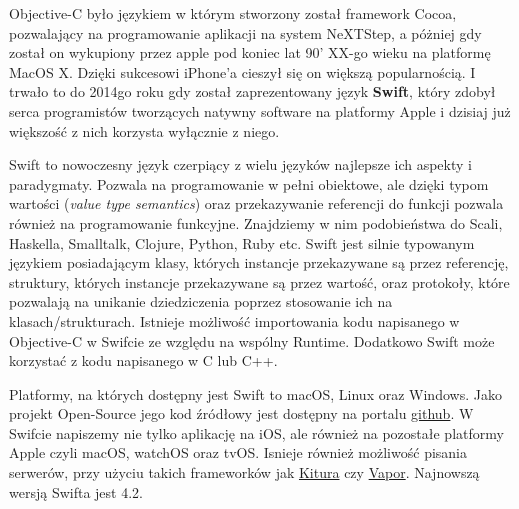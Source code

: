 \documentclass{article}
\begin{document}
Objective-C było językiem w którym stworzony został framework Cocoa, pozwalający
na programowanie aplikacji na system NeXTStep, a póżniej gdy został on wykupiony 
przez apple pod koniec lat 90' XX-go wieku na platformę MacOS X. Dzięki sukcesowi
iPhone'a cieszył się on większą popularnością. I trwało to do 2014go roku gdy
został zaprezentowany język \textbf{Swift}, który zdobył serca programistów tworzących
natywny software na platformy Apple i dzisiaj już większość z nich korzysta wyłącznie
z niego.

Swift to nowoczesny język czerpiący z wielu języków najlepsze ich aspekty i 
paradygmaty. Pozwala na programowanie w pełni obiektowe, ale dzięki typom wartości
(\textit{value type semantics}) oraz przekazywanie referencji do funkcji pozwala 
również na programowanie funkcyjne. Znajdziemy w nim podobieństwa do Scali, Haskella,
Smalltalk, Clojure, Python, Ruby etc. Swift jest silnie typowanym językiem 
posiadającym klasy, których instancje przekazywane są przez referencję, struktury,
których instancje przekazywane są przez wartość, oraz protokoły, które pozwalają
na unikanie dziedziczenia poprzez stosowanie ich na klasach/strukturach. Istnieje
możliwość importowania kodu napisanego w Objective-C w Swifcie ze względu na wspólny
Runtime. Dodatkowo Swift może korzystać z kodu napisanego w C lub C++. 

Platformy, na których dostępny jest Swift to macOS, Linux oraz Windows. Jako 
projekt Open-Source jego kod źródłowy jest dostępny na portalu 
\href{https://github.com/apple/swift}{github}. W Swifcie napiszemy nie tylko
aplikację na iOS, ale również na pozostałe platformy Apple czyli macOS, watchOS
oraz tvOS\@. Isnieje również możliwość pisania serwerów, przy użyciu takich frameworków 
jak \href{https://www.kitura.io}{Kitura} czy \href{https://vapor.codes}{Vapor}.
Najnowszą wersją Swifta jest 4.2.
\end{document}
